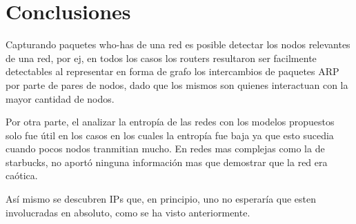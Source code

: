 \section{Conclusiones}

Capturando paquetes who-has de una red es posible detectar los nodos 
relevantes de una red, por ej, en todos los casos los routers resultaron
ser facilmente detectables al representar en forma de grafo los intercambios
de paquetes ARP por parte de pares de nodos, dado que los mismos son quienes
interactuan con la mayor cantidad de nodos. 

Por otra parte, el analizar la entrop\'ia de las redes con los modelos
propuestos solo fue \'util en los casos en los cuales la entrop\'ia fue
baja ya que esto sucedia cuando pocos nodos tranmitian mucho. En redes
mas complejas como la de starbucks, no aport\'o ninguna informaci\'on mas
que demostrar que la red era ca\'otica. 

Así mismo se descubren IPs que, en principio, uno no esperaría que esten involucradas
en absoluto, como se ha visto anteriormente.
